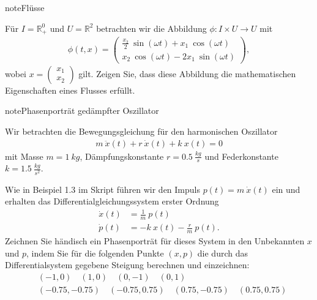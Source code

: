 \documentclass[letterpaper,10pt,english]{jupyterBook}
\begin{document}
\begin{sphinxadmonition}{note}{Flüsse}

\sphinxAtStartPar
Für \(I = \mathbb{R}^0_+\) und \(U = \mathbb{R}^2\) betrachten wir die Abbildung \(\phi: I \times U \rightarrow U\) mit
\begin{equation*}
\begin{split}\phi(t, x) = 
\begin{pmatrix} \frac{x_2}{2} ~ \sin(\omega t) + x_1 ~ \cos(\omega t) \\ x_2 ~ \cos(\omega t) - 2 x_1 ~ \sin(\omega t) \end{pmatrix}, \end{split}
\end{equation*}
\sphinxAtStartPar
wobei \(x = \begin{pmatrix} x_1 \\ x_2 \end{pmatrix}\) gilt.
Zeigen Sie, dass diese Abbildung die mathematischen Eigenschaften eines Flusses erfüllt.
\end{sphinxadmonition}

\begin{sphinxadmonition}{note}{Phasenporträt gedämpfter Oszillator}

\sphinxAtStartPar
Wir betrachten die Bewegungsgleichung für den harmonischen Oszillator
\begin{equation*}
\begin{split}m ~ \ddot x(t) + r ~ \dot x(t) + k ~ x(t) = 0\end{split}
\end{equation*}
\sphinxAtStartPar
mit Masse \(m = 1  ~ kg\), Dämpfungskonstante \(r = 0.5 ~ \frac{kg}{s}\) und Federkonstante \(k = 1.5 ~ \frac{kg}{s^2}\).

\sphinxAtStartPar
Wie in Beispiel 1.3 im Skript führen wir den Impuls \(p(t) = m ~ \dot x(t)\) ein und erhalten das Differentialgleichungssystem erster Ordnung
\begin{equation*}
\begin{split}\dot x(t) &= \frac{1}{m} ~ p(t)\\
\dot p(t) &= -k ~ x(t) - \frac{r}{m} ~ p(t).\end{split}
\end{equation*}
\sphinxAtStartPar
Zeichnen Sie händisch ein Phasenporträt für dieses System in den Unbekannten \(x\) und \(p\), indem Sie für die folgenden Punkte \((x,p)\) die durch das Differentialsystem gegebene Steigung berechnen und einzeichnen:
\begin{equation*}
\begin{split}&(-1, 0) \quad  (1, 0) \quad (0, -1) \quad  (0, 1)\\
&(-0.75, -0.75) \quad  (-0.75, 0.75) \quad (0.75, -0.75) \quad (0.75, 0.75)\end{split}
\end{equation*}\end{sphinxadmonition}
\end{document}
